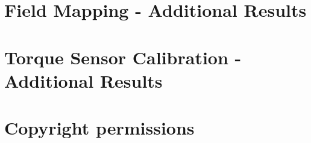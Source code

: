 \documentclass[12pt]{report}  %
\begin{document}
\chapter{Field Mapping - Additional Results}\label{app:addRes_map}


\chapter{Torque Sensor Calibration - Additional Results}\label{app:addRes_senCal}


\chapter{Copyright permissions}\label{sec:app_copyright}


\printnoidxglossaries


%


%

\end{document}

